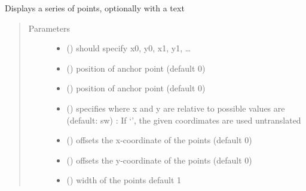 \documentclass[letterpaper,10pt,english]{sphinxmanual}
\begin{document}
\begin{fulllineitems}
\label{\detokenize{Reference:salabim.AnimatePoints}}
Displays a series of points, optionally with a text
\begin{quote}\begin{description}
\item[{Parameters}] \leavevmode\begin{itemize}
\item {} 
 () \textendash{} should specify x0, y0, x1, y1, …

\item {} 
 () \textendash{} position of anchor point (default 0)

\item {} 
 () \textendash{} position of anchor point (default 0)

\item {} 
 () \textendash{} specifies where x and y are relative to 
possible values are (default: sw) : 
If ‘’, the given coordimates are used untranslated

\item {} 
 () \textendash{} offsets the x-coordinate of the points (default 0)

\item {} 
 () \textendash{} offsets the y-coordinate of the points (default 0)

\item {} 
 () \textendash{} width of the points 
default 1


\end{itemize}
\end{description}
\end{quote}
\end{fulllineitems}
\end{document}
